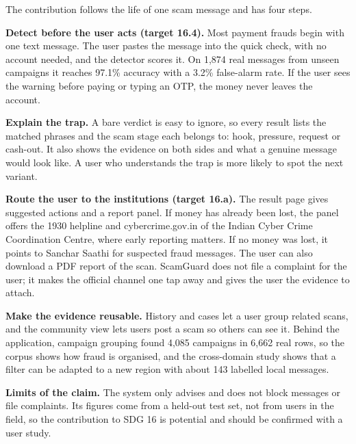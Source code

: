 The contribution follows the life of one scam message and has four steps.

\textbf{Detect before the user acts (target 16.4).} Most payment frauds begin with one text message. The user pastes the message into the quick check, with no account needed, and the detector scores it. On 1,874 real messages from unseen campaigns it reaches 97.1\% accuracy with a 3.2\% false-alarm rate. If the user sees the warning before paying or typing an OTP, the money never leaves the account.

\textbf{Explain the trap.} A bare verdict is easy to ignore, so every result lists the matched phrases and the scam stage each belongs to: hook, pressure, request or cash-out. It also shows the evidence on both sides and what a genuine message would look like. A user who understands the trap is more likely to spot the next variant.

\textbf{Route the user to the institutions (target 16.a).} The result page gives suggested actions and a report panel. If money has already been lost, the panel offers the 1930 helpline and cybercrime.gov.in of the Indian Cyber Crime Coordination Centre, where early reporting matters. If no money was lost, it points to Sanchar Saathi for suspected fraud messages. The user can also download a PDF report of the scan. ScamGuard does not file a complaint for the user; it makes the official channel one tap away and gives the user the evidence to attach.

\textbf{Make the evidence reusable.} History and cases let a user group related scans, and the community view lets users post a scam so others can see it. Behind the application, campaign grouping found 4,085 campaigns in 6,662 real rows, so the corpus shows how fraud is organised, and the cross-domain study shows that a filter can be adapted to a new region with about 143 labelled local messages.

\textbf{Limits of the claim.} The system only advises and does not block messages or file complaints. Its figures come from a held-out test set, not from users in the field, so the contribution to SDG 16 is potential and should be confirmed with a user study.

